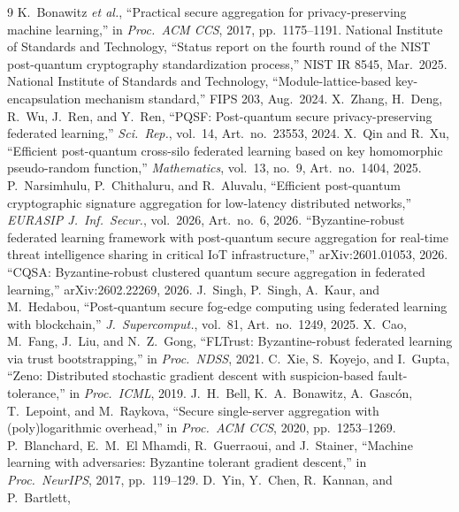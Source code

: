 \documentclass[lettersize,journal]{IEEEtran}
\begin{document}
\begin{thebibliography}{9}
 K.\ Bonawitz \emph{et al.}, ``Practical secure aggregation
for privacy-preserving machine learning,'' in \emph{Proc.\ ACM CCS}, 2017,
pp.\ 1175--1191.
 National Institute of Standards and Technology, ``Status report
on the fourth round of the NIST post-quantum cryptography standardization process,''
NIST IR 8545, Mar.\ 2025.
 National Institute of Standards and Technology,
``Module-lattice-based key-encapsulation mechanism standard,'' FIPS 203, Aug.\ 2024.
 X.\ Zhang, H.\ Deng, R.\ Wu, J.\ Ren, and Y.\ Ren, ``PQSF:
Post-quantum secure privacy-preserving federated learning,'' \emph{Sci.\ Rep.},
vol.\ 14, Art.\ no.\ 23553, 2024.
 X.\ Qin and R.\ Xu, ``Efficient post-quantum cross-silo
federated learning based on key homomorphic pseudo-random function,''
\emph{Mathematics}, vol.\ 13, no.\ 9, Art.\ no.\ 1404, 2025.
 P.\ Narsimhulu, P.\ Chithaluru, and R.\ Aluvalu,
``Efficient post-quantum cryptographic signature aggregation for low-latency
distributed networks,'' \emph{EURASIP J.\ Inf.\ Secur.}, vol.\ 2026, Art.\ no.\ 6, 2026.
 ``Byzantine-robust federated learning framework with
post-quantum secure aggregation for real-time threat intelligence sharing in
critical IoT infrastructure,'' arXiv:2601.01053, 2026.
 ``CQSA: Byzantine-robust clustered quantum secure aggregation in
federated learning,'' arXiv:2602.22269, 2026.
 J.\ Singh, P.\ Singh, A.\ Kaur, and M.\ Hedabou,
``Post-quantum secure fog-edge computing using federated learning with blockchain,''
\emph{J.\ Supercomput.}, vol.\ 81, Art.\ no.\ 1249, 2025.
 X.\ Cao, M.\ Fang, J.\ Liu, and N.\ Z.\ Gong, ``FLTrust:
Byzantine-robust federated learning via trust bootstrapping,'' in \emph{Proc.\ NDSS},
2021.
 C.\ Xie, S.\ Koyejo, and I.\ Gupta, ``Zeno: Distributed stochastic
gradient descent with suspicion-based fault-tolerance,'' in \emph{Proc.\ ICML}, 2019.
 J.\ H.\ Bell, K.\ A.\ Bonawitz, A.\ Gasc\'on, T.\ Lepoint, and
M.\ Raykova, ``Secure single-server aggregation with (poly)logarithmic overhead,''
in \emph{Proc.\ ACM CCS}, 2020, pp.\ 1253--1269.
 P.\ Blanchard, E.\ M.\ El Mhamdi, R.\ Guerraoui, and
J.\ Stainer, ``Machine learning with adversaries: Byzantine tolerant gradient
descent,'' in \emph{Proc.\ NeurIPS}, 2017, pp.\ 119--129.
 D.\ Yin, Y.\ Chen, R.\ Kannan, and P.\ Bartlett,

\end{thebibliography}
\end{document}
